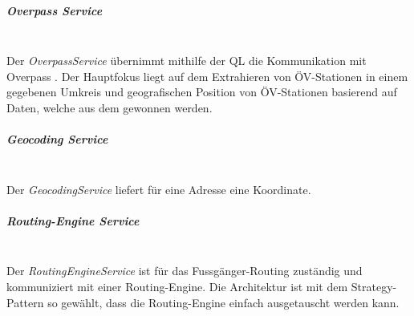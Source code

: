 \subparagraph{Overpass Service}\label{architektur:Overpass Service}~\\
Der \emph{OverpassService} übernimmt mithilfe der \ac{QL} die Kommunikation mit Overpass \cite{wiki:overpass}. Der Hauptfokus liegt auf dem Extrahieren von ÖV-Stationen in einem gegebenen Umkreis und geografischen Position von ÖV-Stationen basierend auf Daten, welche aus dem  gewonnen werden. 

\subparagraph{Geocoding Service}\label{architektur:Geocoding Service}~\\
Der \emph{GeocodingService} liefert für eine Adresse eine Koordinate.

\subparagraph{Routing-Engine Service}\label{architektur:Routing-Engine Service}~\\
Der \emph{RoutingEngineService} ist für das Fussgänger-Routing zuständig und kommuniziert mit einer Routing-Engine. Die Architektur ist mit dem Strategy-Pattern \cite{gof_patterns} so gewählt, dass die Routing-Engine einfach ausgetauscht werden kann.



